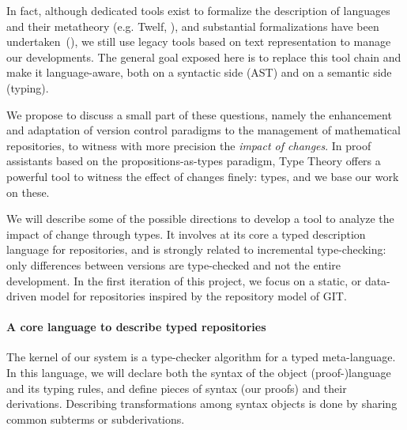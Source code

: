 \documentclass{article}
\newcommand{\remplan}[1]{\noindent\textcolor{bwblue}{$\triangleright$ \textbf{#1}}}
\newcommand{\remtext}[1]{\textcolor{bwgreen}{$\triangleright$ \textsl{#1}}}
\renewcommand{\remplan}[1]{}
\renewcommand{\remtext}[1]{}
\begin{document}
In fact, although dedicated tools exist to formalize the description
of languages and their metatheory (e.g. \textsf{Twelf},
{\cite{pfenning1999system}}), and substantial formalizations have been
undertaken~(\cite{lee07}), we still use legacy tools
based on text representation to manage our developments. The general
goal exposed here is to replace this tool chain and make it
language-aware, both on a syntactic side (AST) and on a semantic side
(typing).

\remplan{Sujet du papier : on focalise sur un problème bien précis}

\remtext{Fri Jun 18, 2010 10:00 AM.
  Un peu de liant. Pour arriver à notre but, il y a une
  question importante à résoudre: si on te donne une méta-théorie
  formalisée, es-tu capable de décrire l'historique d'un développement
  dans cette théorie? Cela induit deux questions : dans quel langage
  et est-ce que ce langage est utilisable (parce qu'a priori, ce n'est
  pas gagné car le développeur travaille en mode ``instantané'' et ne
  veut pas se trimballer ses casseroles tout le temps\ldots).}

We propose to discuss a small part of these questions, namely the
enhancement and adaptation of version control paradigms to the
management of mathematical repositories, to witness with more
precision the \emph{impact of changes}. In proof assistants based on
the propositions-as-types paradigm, Type Theory offers a powerful tool
to witness the effect of changes finely: types, and we base our work
on these.

We will describe some of the possible directions to develop a tool to
analyze the impact of change through types. It involves at its core a
typed description language for repositories, and is strongly related
to incremental type-checking: only differences between versions are
type-checked and not the entire development. In the first iteration of
this project, we focus on a static, or data-driven model for
repositories inspired by the repository model of \textsf{GIT}.

\paragraph{A core language to describe typed repositories}

The kernel of our system is a type-checker algorithm for a typed
meta-language. In this language, we will declare both the syntax of
the object (proof-)language and its typing rules, and define pieces of
syntax (our proofs) and their derivations. Describing transformations
among syntax objects is done by sharing common subterms or
subderivations.
\end{document}
